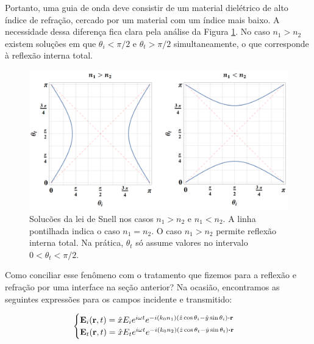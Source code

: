 \documentclass[12pt,a4paper]{report}
\begin{document}
\begin{center}
\end{center}

Portanto, uma guia de onda deve consistir de um material dielétrico de alto índice de refração, cercado por um material com um índice mais baixo. A necessidade dessa diferença fica clara pela análise da Figura \ref{lei.de.snell}. No caso $n_1>n_2$ existem soluções em que $\theta_i<\pi/2$ e $\theta_t>\pi/2$ simultaneamente, o que corresponde à reflexão interna total.

\begin{figure}[H]
    \centering
    \includegraphics[width=1\linewidth]{snell solutions.png}
    \caption{Solucões da lei de Snell nos casos $n_1>n_2$ e $n_1<n_2$. A linha pontilhada indica o caso $n_1=n_2$. O caso $n_1>n_2$ permite reflexão interna total. Na prática, $\theta_t$ só assume valores no intervalo $0<\theta_t<\pi/2$.}
    \label{lei.de.snell}
\end{figure}

Como conciliar esse fenômeno com o tratamento que fizemos para a reflexão e refração por uma interface na seção anterior? Na ocasião, encontramos as seguintes expressões para os campos incidente e transmitido:

\begin{equation*}
    \begin{cases}
    \textbf{E}_i(\textbf{r},t)=\hat{x}E_ie^{i\omega t}e^{-i(k_0n_1)(\hat{z}\cos\theta_i-\hat{y}\sin\theta_i)\vdot\textbf{r}}\\
    
    \textbf{E}_t(\textbf{r},t)=\hat{x}E_te^{i\omega t}e^{-i(k_0n_2)(\hat{z}\cos\theta_t-\hat{y}\sin\theta_t)\vdot\textbf{r}}
    \end{cases}
\end{equation*}
\end{document}
